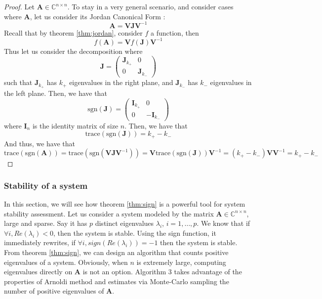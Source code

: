 \documentclass[11pt]{article}
\numberwithin{equation}{section}
\begin{document}
\begin{proof}
    Let $\mathbf{A}\in\mathbb{C}^{n\times n}$. To stay in a very general scenario, and consider cases where $\mathbf{A}$, let us consider its Jordan Canonical Form :
    \begin{equation*}
        \mathbf{A} = \mathbf{VJV}^{-1}
    \end{equation*} 
    Recall that by theorem \ref{thm:jordan}, consider $f$ a function, then 
    \begin{equation*}
        f(\mathbf{A}) = \mathbf{V}f(\mathbf{J})\mathbf{V}^{-1}
    \end{equation*}
    Thus let us consider the decomposition where 
    \begin{equation*}
        \mathbf{J} = \begin{pmatrix}
            \mathbf{J}_{k_+} & 0 \\ 0 & \mathbf{J}_{k_-}
        \end{pmatrix}
    \end{equation*}
    such that $\mathbf{J}_{k_+}$ has $k_+$ eigenvalues in the right plane, and $\mathbf{J}_{k_-}$ has $k_-$ eigenvalues in the left plane. Then, we have that
    \begin{equation*}
        \text{sgn}(\mathbf{J}) = \begin{pmatrix}
            \mathbf{I}_{k_+} & 0 \\ 0 & -\mathbf{I}_{k_-}
        \end{pmatrix}
    \end{equation*}
    where $\mathbf{I}_n$ is the identity matrix of size $n$. Then, we have that
    \begin{equation*}
        \text{trace}(\text{sgn}(\mathbf{J})) = k_+ - k_-
    \end{equation*}
    And thus, we have that
    \begin{equation*}
        \text{trace}(\text{sgn}(\mathbf{A})) = \text{trace}(\text{sgn}(\mathbf{VJV}^{-1})) = \mathbf{V}\text{trace}(\text{sgn}(\mathbf{J}))\mathbf{V}^{-1} = (k_+-k_-)\mathbf{V}\mathbf{V}^{-1} = k_+ - k_-
    \end{equation*}
\end{proof}
\subsubsection{Stability of a system}
In this section, we will see how theorem \ref{thm:sign} is a powerful tool for system stability assessment. Let us consider a system modeled by the matrix $\mathbf{A}\in\mathbb{C}^{n\times n}$, large and sparse. Say it has $p$ distinct eigenvalues $\lambda_i$, $i=1,\dots,p$. We know that if $\forall i, Re(\lambda_i)<0$, then the system is stable. Using the sign function, it immediately rewrites, if $\forall i, sign(Re(\lambda_i)) = -1$ then the system is stable. From theorem \ref{thm:sign}, we can design an algorithm that counts positive eigenvalues of a system. Obviously, when $n$ is extremely large, computing eigenvalues directly on $\mathbf{A}$ is not an option. Algorithm 3 takes advantage of the properties of Arnoldi method and estimates via Monte-Carlo sampling the number of positive eigenvalues of $\mathbf{A}$.
\end{document}
